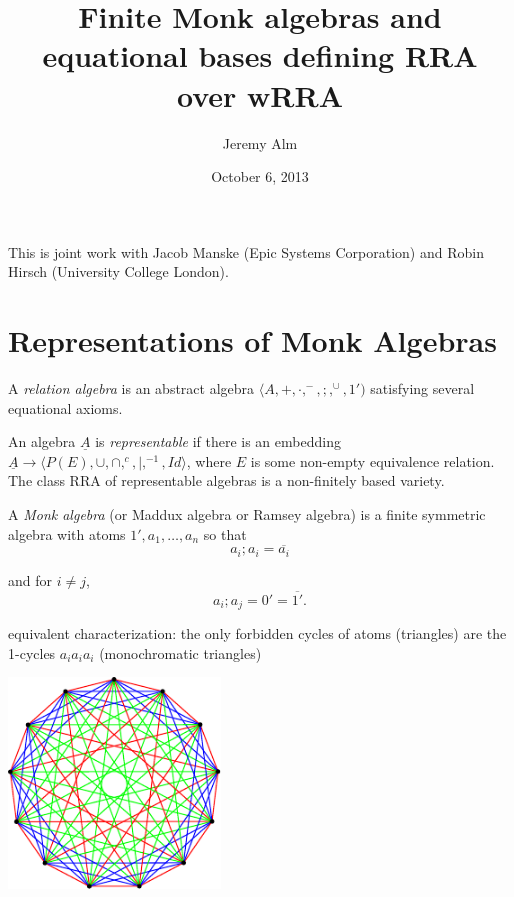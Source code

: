 \documentclass[10pt, handout]{beamer}
\title{Finite Monk algebras and equational bases defining \textsf{RRA} over \textsf{wRRA}}
\author{Jeremy Alm}
\institute{Illinois College}
\date{October 6, 2013}
\renewcommand{\1}{1^\text{'}}
\newcommand{\0}{0^\text{'}}
\begin{document}
\frame{
\titlepage
}
\frame
{
This is joint work with Jacob Manske (Epic Systems Corporation) and Robin Hirsch (University College London).

}


\section{Representations of Monk Algebras}
\frame
{
A \emph{relation algebra} is an abstract algebra $\langle A,+,\cdot,^-,;,^\cup,1')$ satisfying several equational axioms.

\bigskip

An algebra $\underline{A}$ is \emph{representable} if there is an embedding $\underline{A}\rightarrow \langle P(E),\cup,\cap,^c,|,^{-1},Id\rangle$, where $E$ is some non-empty equivalence relation.  The class RRA of representable algebras is a non-finitely based variety.
}




\frame
{
A \emph{Monk algebra} (or Maddux algebra or Ramsey algebra) is a finite symmetric algebra with atoms $1',a_1,\ldots,a_n$ so that $$a_i;a_i=\overline{a_i}$$

and for $i\neq j$,
 $$a_i;a_j=0'=\overline{1'}.$$

\pause


\bigskip


equivalent characterization:
the only forbidden cycles of atoms (triangles) are the 1-cycles $a_ia_ia_i$ (monochromatic triangles)
}




\frame
{
\begin{center}


\includegraphics*[width=160pt]{Z13}



\end{center}
}
\end{document}
